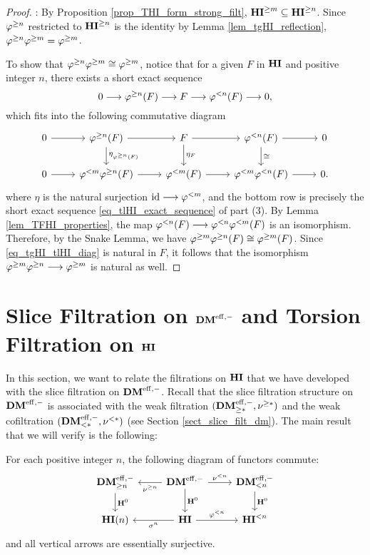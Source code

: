 \begin{proof}
 : By Proposition \ref{prop_THI_form_strong_filt},
$\THI{m} \subseteq \THI{n}$. Since $\tgHI{n}$ restricted to
$\THI{n}$ is the identity by Lemma \ref{lem_tgHI_reflection}, 
$\tgHI{n} \tgHI{m} = \tgHI{m}$. 

To show that $\tgHI{n} \tgHI{m} \cong \tgHI{m}$, notice that
for a given $F$ in $\HI$ and positive integer $n$, there exists a 
short exact sequence
\[
0 \to \tgHI{n}(F) \to F \to \tlHI{n}(F) \to 0,
\]
which fits into the following commutative diagram
\begin{equation}\label{eq_tgHI_tlHI_diag}
\begin{tikzcd}
0 \arrow{r} &
\tgHI{n}(F) \arrow{r} \arrow{d}{\eta_{\tgHI{n}(F)}} &
F \arrow{r} \arrow{d}{\eta_F} &
\tlHI{n}(F) \arrow{r} \arrow{d}{\cong} &
0 \\
0 \arrow{r} &
\tlHI{m} \tgHI{n}(F) \arrow{r} &
\tlHI{m}(F) \arrow{r} &
\tlHI{m}\tlHI{n}(F) \arrow{r} &
0.
\end{tikzcd}
\end{equation}
where $\eta$ is the natural surjection $\id \to \tlHI{m}$, and
the bottom row is precisely the short exact sequence 
\eqref{eq_tlHI_exact_sequence} of part (3). By Lemma 
\ref{lem_TFHI_properties}, the map $\tlHI{n}(F) \to \tlHI{n} 
\tlHI{m}(F)$ is an isomorphism. Therefore, by the Snake Lemma, we 
have $\tgHI{m} \tgHI{n}(F) \cong \tgHI{m}(F)$. Since 
\eqref{eq_tgHI_tlHI_diag} is natural in $F$, it follows that the 
isomorphism $\tgHI{m}\tgHI{n} \to \tgHI{m}$ is natural as well.
\end{proof}

\section{Slice Filtration on $\DMeff$ and Torsion Filtration on $\HI$}

In this section, we want to relate the filtrations on $\HI$
that we have developed with the slice filtration on $\DMeff$. 
Recall that the slice filtration structure on $\DMeff$ is 
associated with the weak filtration $(\GFiltDM[*]{\DMeff}, 
\sgDM{*})$ and the weak cofiltration $(\LFiltDM[*]{\DMeff}, 
\slDM{*})$ (see Section \ref{sect_slice_filt_dm}). The main result 
that we will verify is the following:

\begin{prop}\label{prop_H_commute_with_filt}
For each positive integer $n$, the following diagram of functors 
commute:
\[
\begin{tikzcd}
\GFiltDM[n]{\DMeff} \arrow{d}{\HH^0} &
\DMeff \arrow{l}{\sgDM{n}} \arrow{r}{\slDM{n}} \arrow{d}{\HH^0} &
\LFiltDM[n]{\DMeff} \arrow{d}{\HH^0} \\
\HI(n) &
\HI \arrow{l}{\sgHI{n}} \arrow{r}{\tlHI{n}} &
\TFHI{n}
\end{tikzcd}
\]
and all vertical arrows are essentially surjective.
\end{prop}

